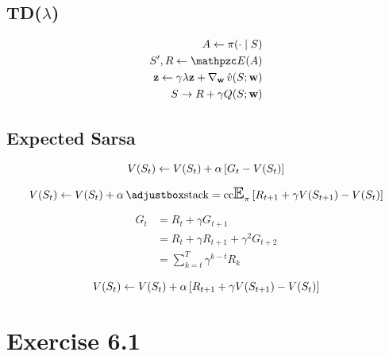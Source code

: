\documentclass[a4paper,11pt]{article}
\begin{document}
\subsection{TD($\lambda$)} %
\label{sub:td}

\begin{align*}
	A  \generate \apply{\pi}{\cdot \mid S} \\
	S',R \generate \apply{\env}{A} \\
	\ve{z} \generate \gamma \lambda \ve{z} + \grad{\pred{v}} {S;\ve{w}}{\ve{w}} \\
	S \to  R+\gamma\apply{Q}{S;\ve{w}} 
\end{align*}



\subsection{Expected Sarsa} %
\label{sub:expected_sarsa}



\begin{equation}
	V\!\left(S_{t}\right) \gets V\!\left(S_{t}\right) + \alpha \left[G_{t}- V\!\left(S_{t}\right)\right]
\end{equation}

\begin{equation}
	\apply{V}{S_{t}} \gets \apply{V}{S_{t}} + \alpha \applyb{\expect_{\pi}}{R_{t+1} + \gamma\apply{V}{S_{t+1}}-\apply{V}{S_{t}}}
\end{equation}

\begin{align*}
	G_{t} &= R_{t} + \gamma G_{t+1} \\
		& = R_{t} + \gamma R_{t+1} + \gamma^{2} G_{t+2} \\
		& = \sum_{k=t}^{T} \gamma^{k-t} R_{k}
\end{align*}

\begin{equation}
	V\!\left(S_{t}\right) \gets V\!\left(S_{t}\right) + \alpha \left[R_{t+1} + \gamma V\!\left(S_{t+1}\right) - V\!\left(S_{t}\right)\right]
\end{equation}

\newpage

\section{Exercise 6.1} %
\label{sec:exercise_6_1}
\end{document}

